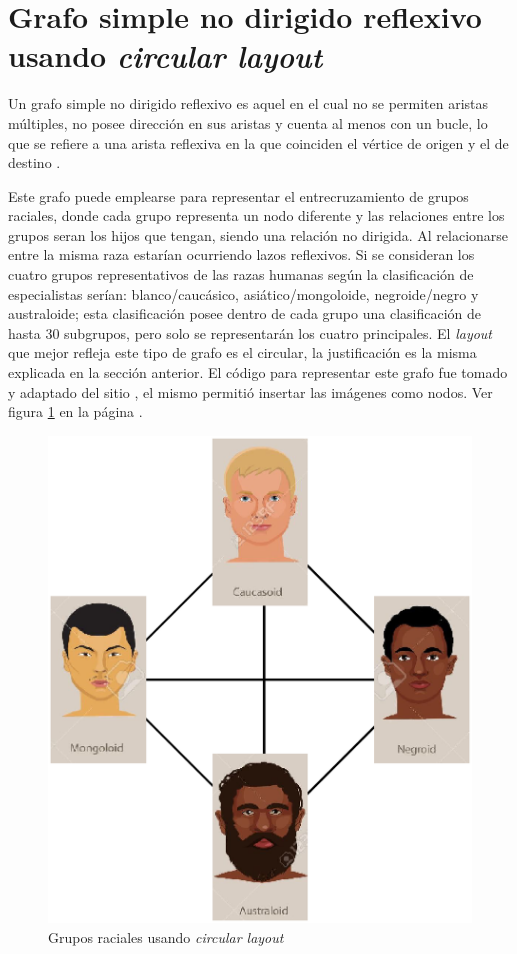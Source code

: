 \documentclass{article}
\begin{document}
\section{Grafo simple no dirigido reflexivo usando \textit{circular layout}}

Un grafo simple no dirigido reflexivo es aquel en el cual no se permiten aristas múltiples, no posee dirección en sus aristas y cuenta al menos con un bucle, lo que se refiere a una arista reflexiva en la que coinciden el vértice de origen y el de destino \cite{Elisa}. 

Este grafo puede emplearse para representar el entrecruzamiento de grupos raciales, donde cada grupo representa un nodo diferente y las relaciones entre los grupos seran los hijos que tengan, siendo una relación no dirigida. Al relacionarse entre la misma raza estarían ocurriendo lazos reflexivos. Si se consideran los cuatro grupos representativos de las razas humanas según la clasificación de especialistas serían: blanco/caucásico, asiático/mongoloide, negroide/negro y australoide; esta clasificación posee dentro de cada grupo una clasificación de hasta 30 subgrupos, pero solo se representarán los cuatro principales. El \textit{layout} que mejor refleja este tipo de grafo es el circular, la justificación es la misma explicada en la sección anterior. El código para representar este grafo fue tomado y adaptado del sitio \cite{codimag}, el mismo permitió insertar las imágenes como nodos. Ver figura \ref{fig:Fig03} en la página \pageref{fig:Fig03}.
\newpage


\begin{figure}[htbp]
    \centering
    \includegraphics[scale=0.4]{imagenes1/Fig03.eps}
    \caption{Grupos raciales usando \textit{circular layout}}
    \label{fig:Fig03}
\end{figure}
\end{document}

